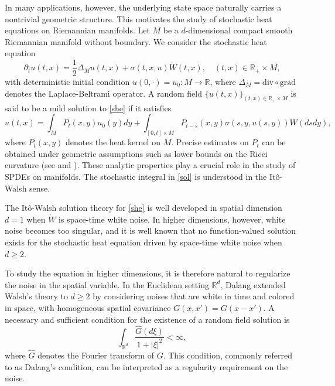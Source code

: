 \documentclass[12pt]{amsart}
\numberwithin{equation}{section}
\newcommand{\R}{\mathbb{R}}
\newcommand{\1}{\mathbf{1}}
\begin{document}
In many applications, however, the underlying state space naturally carries a nontrivial geometric structure. This motivates the study of stochastic heat equations on Riemannian manifolds. Let $M$ be a $d$-dimensional compact smooth Riemannian manifold without boundary. We consider the stochastic heat equation
\begin{equation}
\label{she}
\partial_t u(t,x)=\frac{1}{2}\Delta_M u(t,x)+\sigma(t,x,u)\dot{W}(t,x),\quad (t,x)\in \R_+\times M,
\end{equation}
with deterministic initial condition $u(0,\cdot)=u_0:M\to\R$, where $\Delta_M=\mathrm{div}\circ\mathrm{grad}$ denotes the Laplace-Beltrami operator. A random field $\{u(t,x)\}_{(t,x)\in\R_+\times M}$ is said to be a mild solution to \eqref{she} if it satisfies
\begin{equation}
\label{sol}
u(t,x)=\int_M P_t(x,y)u_0(y)dy+\int_{[0,t]\times M}P_{t-s}(x,y)\sigma(s,y,u(s,y))W(dsdy),
\end{equation}
where $P_t(x,y)$ denotes the heat kernel on $M$. Precise estimates on $P_t$ can be obtained under geometric assumptions such as lower bounds on the Ricci curvature (see \cite{10.1007/BF02399203} and \cite{davies1989pointwise}). These analytic properties play a crucial role in the study of SPDEs on manifolds. The stochastic integral in \eqref{sol} is understood in the It\^o-Walsh sense.

The It\^o-Walsh solution theory for \eqref{she} is well developed in spatial dimension $d=1$ when $\dot{W}$ is space-time white noise. In higher dimensions, however, white noise becomes too singular, and it is well known that no function-valued solution exists for the stochastic heat equation driven by space-time white noise when $d\geq2$.

To study the equation in higher dimensions, it is therefore natural to regularize the noise in the spatial variable. In the Euclidean setting $\R^d$, Dalang \cite{dalang1999extending} extended Walsh’s theory to $d\geq2$ by considering noises that are white in time and colored in space, with homogeneous spatial covariance $G(x,x')=G(x-x')$. A necessary and sufficient condition for the existence of a random field solution is
\begin{equation*}
    \int_{\R^d}\frac{\hat{G}(d\xi)}{1+|\xi|^2}<\infty,
\end{equation*}
where $\hat{G}$ denotes the Fourier transform of $G$. This condition, commonly referred to as Dalang’s condition, can be interpreted as a regularity requirement on the noise.
\end{document}
